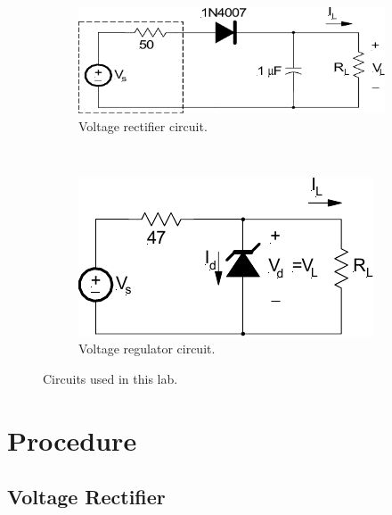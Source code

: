 \documentclass{article}
\begin{document}
\begin{figure}[hbtp]
  \centering
  \begin{subfigure}[b]{0.6\textwidth}
    \includegraphics[width=\textwidth]{volt_rect}
    \caption{\label{fig:volt_rect} Voltage rectifier circuit.}
  \end{subfigure}%
  ~
  \begin{subfigure}[b]{0.4\textwidth}
    \includegraphics[width=\textwidth]{volt_reg}
    \caption{\label{fig:volt_reg} Voltage regulator circuit.}
  \end{subfigure}
  \caption{\label{fig:circuits_tested} Circuits used in this lab.}
\end{figure}

\section{Procedure}
\label{sec:procedure}

\subsection{Voltage Rectifier}
\label{sec:rectifier}
\end{document}
